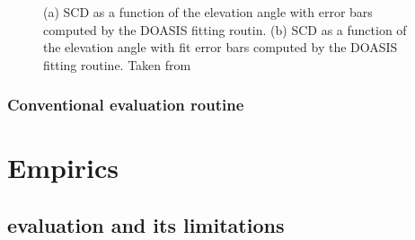 \documentclass  [
  paper    = a4,
  BCOR     = 10mm,
  twoside,
  fontsize = 12pt,
  fleqn,
  toc      = bibnumbered,
  toc      = listofnumbered,
  numbers  = noendperiod,
  headings = normal,
  listof   = leveldown,
  version  = 3.03
]                                       {scrreprt}
\begin{document}
	\begin{figure}
		\caption[(a)  SCD as a function of the elevation angle with error bars computed by the DOASIS fitting routin. (b)  SCD as a function of the elevation angle computed by the DOASIS fitting routine.  Taken from \cite{WarnachSimon}]{(a)  SCD as a function of the elevation angle with error bars computed by the DOASIS fitting routin. (b)  SCD as a function of the elevation angle with fit error bars computed by the DOASIS fitting routine.  Taken from \cite{WarnachSimon}}
		\label{fig:plumeref}
	\end{figure}

	
	\section{Conventional evaluation routine\label{Chap:evalroutine}}
	
		
	\part{Empirics}
	\chapter{  evaluation and its limitations}
	
\end{document}
